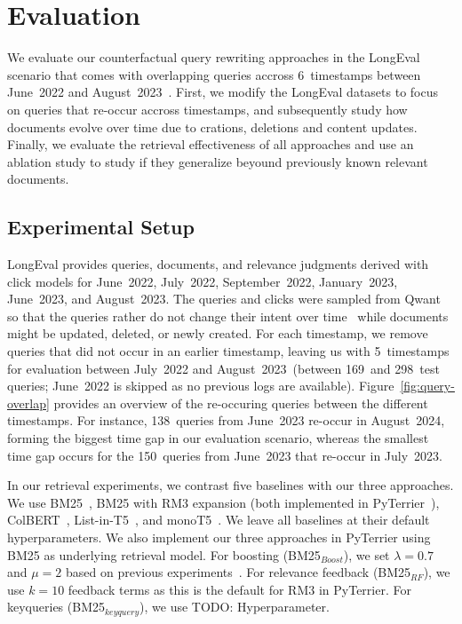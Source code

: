 \section{Evaluation}

We evaluate our counterfactual query rewriting approaches in the LongEval scenario that comes with overlapping queries accross 6~timestamps between June~2022 and August~2023~\cite{alkhalifa:2023,alkhalifa:2024,galuscakova:2023}. First, we modify the LongEval datasets to focus on queries that re-occur accross timestamps, and subsequently study how documents evolve over time due to crations, deletions and content updates. Finally, we evaluate the retrieval effectiveness of all approaches and use an ablation study to study if they generalize beyound previously known relevant documents.

\subsection{Experimental Setup}

LongEval provides queries, documents, and relevance judgments derived with click models for June~2022, July~2022, September~2022, January~2023, June~2023, and August~2023. The queries and clicks were sampled from Qwant so that the queries rather do not change their intent over time~\cite{galuscakova:2023} while documents might be updated, deleted, or newly created. For each timestamp, we remove queries that did not occur in an earlier timestamp, leaving us with 5~timestamps for evaluation between July~2022 and August~2023~(between 169~and 298~test queries; June~2022 is skipped as no previous logs are available). Figure~\ref{fig:query-overlap} provides an overview of the re-occuring queries between the different timestamps. For instance, 138~queries from June~2023 re-occur in August~2024, forming the biggest time gap in our evaluation scenario, whereas the smallest time gap occurs for the 150~queries from June~2023 that re-occur in July~2023.

In our retrieval experiments, we contrast five baselines with our three approaches. We use BM25~\cite{robertson:1994}, BM25 with RM3 expansion (both implemented in PyTerrier~\cite{macdonald:2020}), ColBERT~\cite{khattab:2020}, List-in-T5~\cite{tamber:2023}, and monoT5~\cite{nogueira:2020}. We leave all baselines at their default hyperparameters. We also implement our three approaches in PyTerrier using BM25 as underlying retrieval model. For boosting (BM25$_{Boost}$), we set $\lambda=0.7$ and $\mu=2$ based on previous experiments~\cite{keller:2024b}. For relevance feedback  (BM25$_{RF}$), we use $k=10$ feedback terms as this is the default for RM3 in PyTerrier. For keyqueries (BM25$_{keyquery}$), we use {\color{red} TODO: Hyperparameter}.

